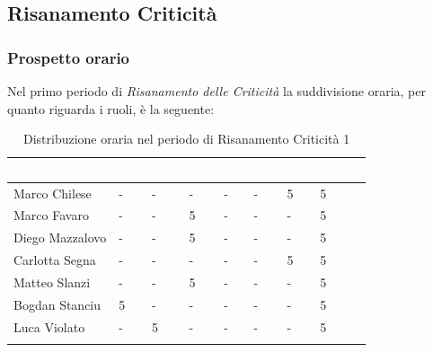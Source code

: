 \newpage
\subsection{Risanamento Criticità}
\label{PRC1}
\subsubsection{Prospetto orario}

Nel primo periodo di \textit{Risanamento delle Criticità} la suddivisione oraria, per quanto riguarda i ruoli, è la seguente:

\begin{longtable}{|C{.30\textwidth}|C{.06\textwidth}|C{.06\textwidth}|C{.06\textwidth} | C{.06\textwidth}| C{.06\textwidth} | C{.06\textwidth} | C{.10\textwidth} |}
\hline
{}	\textbf{\textcolor{white}{Nome}} & \textbf{\textcolor{white}{RE}} & \textbf{\textcolor{white}{AM}} & \textbf{\textcolor{white}{AN}} & \textbf{\textcolor{white}{PJ}} & \textbf{\textcolor{white}{PR}} & \textbf{\textcolor{white}{VE}} & \textbf{\textcolor{white}{Totale}}\\
\hline 
Marco Chilese & - & - & - & - & - & 5 & 5 \\
\hline
{}Marco Favaro & - & - & 5 & - & - & - & 5 \\
\hline
Diego Mazzalovo & - & - & 5 & - & - & - & 5 \\
\hline
{}Carlotta Segna & - & - & - & - & - & 5 & 5 \\
\hline
Matteo Slanzi & - & - & 5 & - & - & - & 5 \\
\hline
{}Bogdan Stanciu & 5 & - & - & - & - & - & 5 \\
\hline
Luca Violato & - & 5 & - & - & - & - & 5 \\
\hline

\caption{Distribuzione oraria nel periodo di Risanamento Criticità 1}
\label{Distribuzione oraria del periodo di rc1}
\end{longtable}



